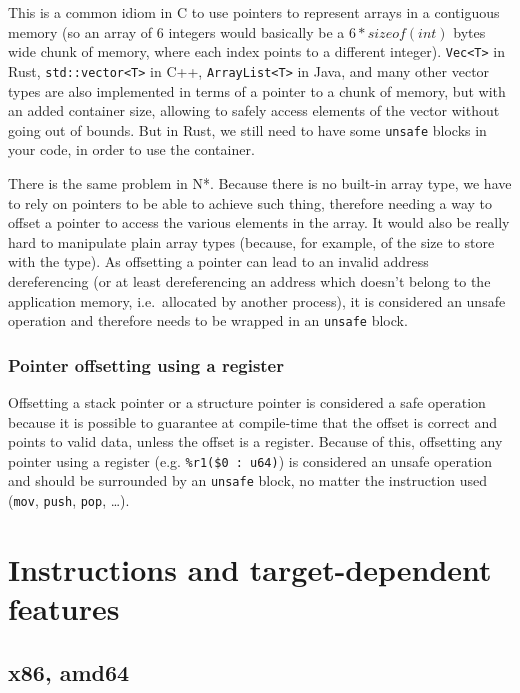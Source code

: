 This is a common idiom in C to use pointers to represent arrays in a contiguous memory (so an array of 6 integers would basically be a $6 * sizeof(int)$ bytes wide chunk of memory, where each index points to a different integer).
\texttt{Vec<T>} in Rust, \texttt{std::vector<T>} in C++, \texttt{ArrayList<T>} in Java, and many other vector types are also implemented in terms of a pointer to a chunk of memory, but with an added container size, allowing to safely access elements of the vector without going out of bounds.
But in Rust, we still need to have some \texttt{unsafe} blocks in your code, in order to use the container.

There is the same problem in N*.
Because there is no built-in array type, we have to rely on pointers to be able to achieve such thing, therefore needing a way to offset a pointer to access the various elements in the array.
It would also be really hard to manipulate plain array types (because, for example, of the size to store with the type).
As offsetting a pointer can lead to an invalid address dereferencing (or at least dereferencing an address which doesn't belong to the application memory, i.e.\ allocated by another process), it is considered an unsafe operation and therefore needs to be wrapped in an \texttt{unsafe} block.

\subsection{Pointer offsetting using a register}\label{subsec:nstar-common-unsafe-ptroffsetreg}

Offsetting a stack pointer or a structure pointer is considered a safe operation because it is possible to guarantee at compile-time that the offset is correct and points to valid data, unless the offset is a register.
Because of this, offsetting any pointer using a register (e.g. \texttt{\%r1(\$0 : u64)}) is considered an unsafe operation and should be surrounded by an \texttt{unsafe} block, no matter the instruction used (\texttt{mov}, \texttt{push}, \texttt{pop}, \ldots).

\chapter{Instructions and target-dependent features}\label{chap:nstar-specific}

\section{x86, amd64}\label{sec:nstar-specific-x86amd64}

